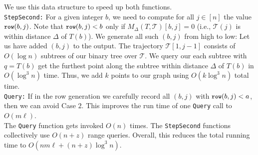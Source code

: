 \documentclass[11pt]{article}
\newcommand{\minrow}{\texttt{\small row}}
\begin{document}
%
\noindent     
We use this data structure to speed up both functions.  \\
%
%
%
%
%
    \texttt{StepSecond:} 
    For a given integer $b$, we need to compute for all $j \in [n]$ the value $\minrow(b, j)$. 
    Note that $\minrow(b, j) < b$ only if $M_\Delta(T, \mathcal{T})[b, j] = 0$ (i.e., $\mathcal{T}(j)$ is within distance $\Delta$ of $T(b)$).   
    We generate all such $(b, j)$ from high to low: 
    Let us have added $(b, j)$ to the output. 
    The trajectory $\mathcal{T}[1, j - 1]$ consists of $O(\log n)$ subtrees of our binary tree over $\mathcal{T}$. We query our each subtree with $q = T(b)$ get the furthest point along the subtree  within distance $\Delta$ of $T(b)$ in $O(\log^3 n)$ time. Thus, we add $k$ points to our graph using $O(k \log^3 n)$ total time.  \\
%
    \texttt{Query:} 
    If in the row generation we carefully record all $(b, j)$ with $\minrow(b, j) < a$, then we can avoid Case $2$. This improves the run time of one \texttt{Query} call to $O(m \ell)$. \\
%
%
\noindent   
    The \texttt{Query} function gets invoked $O(n)$ times. The \texttt{StepSecond} functions collectively use $O(n + z)$ range queries. 
    Overall, this reduces the total running time to $O( n m \ell + (n+z) \log^3 n)$.
%
%
%
%
\end{document}
